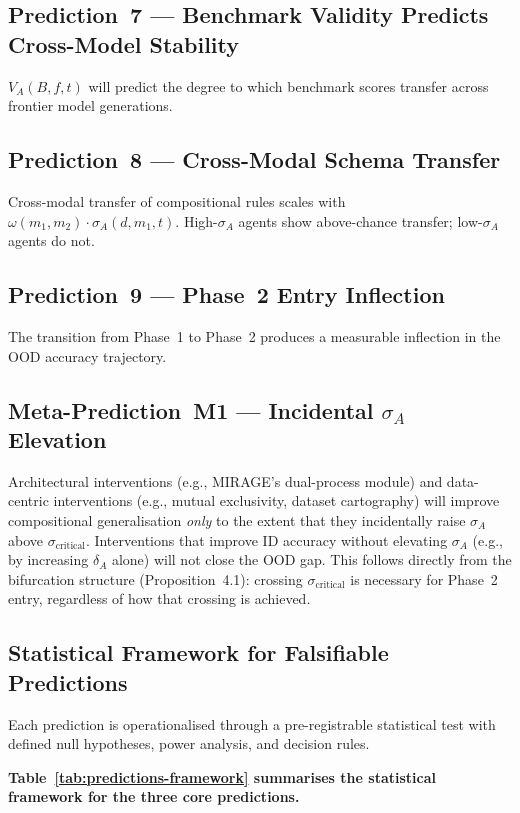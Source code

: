 \documentclass[11pt,a4paper]{article}
\begin{document}
\subsection{Prediction~7 --- Benchmark Validity Predicts Cross-Model
Stability}
$V_A(B,f,t)$ will predict the degree to which benchmark scores transfer
across frontier model generations.

\subsection{Prediction~8 --- Cross-Modal Schema Transfer}
Cross-modal transfer of compositional rules scales with
$\omega(m_1, m_2) \cdot \sigma_A(d, m_1, t)$. High-$\sigma_A$ agents
show above-chance transfer; low-$\sigma_A$ agents do not.

\subsection{Prediction~9 --- Phase~2 Entry Inflection}
The transition from Phase~1 to Phase~2 produces a measurable inflection
in the OOD accuracy trajectory.

\subsection{Meta-Prediction~M1 --- Incidental \texorpdfstring{$\sigma_A$}{sigma\_A} Elevation}\label{sec:meta-M1}
Architectural interventions (e.g., MIRAGE's dual-process module) and
data-centric interventions (e.g., mutual exclusivity, dataset
cartography) will improve compositional generalisation \emph{only}
to the extent that they incidentally raise $\sigma_A$ above
$\sigma_{\text{critical}}$. Interventions that improve ID accuracy
without elevating $\sigma_A$ (e.g., by increasing $\delta_A$ alone)
will not close the OOD gap. This follows directly from the
bifurcation structure (Proposition~4.1): crossing
$\sigma_{\text{critical}}$ is necessary for Phase~2 entry, regardless
of how that crossing is achieved.

\subsection{Statistical Framework for Falsifiable Predictions}\label{sec:statistical-framework}

Each prediction is operationalised through a pre-registrable statistical
test with defined null hypotheses, power analysis, and decision rules.

\textbf{Table~\ref{tab:predictions-framework} summarises the statistical
framework for the three core predictions.}
\end{document}
